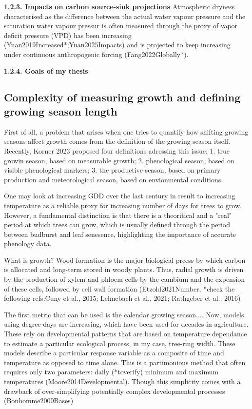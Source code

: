 \documentclass{article}
\begin{document}
\textbf{1.2.3. Impacts on carbon source-sink projections} 
Atmospheric dryness characterised as the difference between the actual water vapour pressure and the saturation water vapour pressur is often measured through the proxy of vapor deficit pressure (VPD) has been increasing (Yuan2019Increased*;Yuan2025Impacts) and is projected to keep increasing under continuous anthropogenic forcing (Fang2022Globally*).

\textbf{1.2.4. Goals of my thesis} 

\subsection{Complexity of measuring growth and defining growing season length}
First of all, a problem that arises when one tries to quantify how shifting growing seasons affect growth comes from the definition of the growing season itself. Recently, Korner 2023 proposed four definitions adressing this issue: 1. true growin season, based on measurable growth; 2. phenological season, based on visible phenological markers; 3. the productive season, based on primary production and meteorological season, based on envionmental conditions %

One may look at increasing GDD over the last century in result to increasing temperature as a reliable proxy for increasing number of days for trees to grow. However, a fundamental distinction is that there is a theoritical and a "real" period at which trees can grow, which is usually defined through the period between budburst and leaf senesence, highlighting the importance of accurate phenology data. 


What is growth? Wood formation is the major biological prcess by which carbon is allocated and long-term stored in woody plants. Thus, radial growth is driven by the production of xylem and phloem cells by the cambium and the expension of these cells, followed by cell wall formation (Etzold2021Number, *check the following refs:Cuny et al., 2015; Lehnebach et al., 2021; Rathgeber et al., 2016)

The first metric that can be used is the calendar growing season.... Now, models using degree-days are increasing, which have been used for decades in agriculture. These rely on developmental patterns that are based on temperature dependance to estimate a particular ecological process, in my case, tree-ring width. These models describe a particular response variable as a composite of time and temperature as opposed to time alone. This is a partimonious method that often requires only two parameters: daily (*toverify) minimum and maximum temperatures (Moore2014Developmental).  Though this simplicity comes with a drawback of over-simplifying potentially complex developmental processes (Bonhomme2000Bases)
\end{document}
